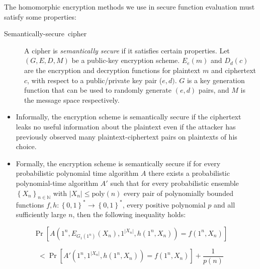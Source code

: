 The homomorphic encryption methods we use in secure function evaluation
must satisfy some properties:
\begin{description}
\item [{Semantically-secure~cipher}] A cipher is \textit{semantically
secure} \cite{Goldwasser:Micali} if it satisfies certain properties.
Let $(G,E,D,M)$ be a public-key encryption scheme. $E_{e}(m)$ and
$D_{d}(c)$ are the encryption and decryption functions for plaintext
$m$ and ciphertext $c$, with respect to a public/private key pair
($e,d)$. $G$ is a key generation function that can be used to randomly
generate $(e,d)$ pairs, and $M$ is the message space respectively. \end{description}
\begin{itemize}
\item Informally, the encryption scheme is semantically secure if the ciphertext
leaks no useful information about the plaintext even if the attacker
has previously observed many plaintext-ciphertext pairs on plaintexts
of his choice. 
\item Formally, the encryption scheme is semantically secure if for every
probabilistic polynomial time algorithm $A$ there exists a probabilistic
polynomial-time algorithm $A'$ such that for every probabilistic
ensemble $\left\{ X_{n}\right\} _{n\in\mathbb{N}}$ with $|X_{n}|\le\mbox{poly}\left(n\right)$
every pair of polynomially bounded functions $f,h:\left\{ 0,1\right\} ^{*}\rightarrow\left\{ 0,1\right\} ^{*}$,
every positive polynomial $p$ and all sufficiently large $n$, then
the following inequality holds:
\end{itemize}
\[
\Pr\left[A\left(1^{n},E_{G_{1}\left(1^{n}\right)}\left(X_{n}\right),1^{|X_{n}|},h\left(1^{n},X_{n}\right)\right)=f\left(1^{n},X_{n}\right)\right]\]


\[
<\Pr\left[A'\left(1^{n},1^{|X_{n}|},h\left(1^{n},X_{n}\right)\right)=f\left(1^{n},X_{n}\right)\right]+\frac{1}{p(n)}\]

